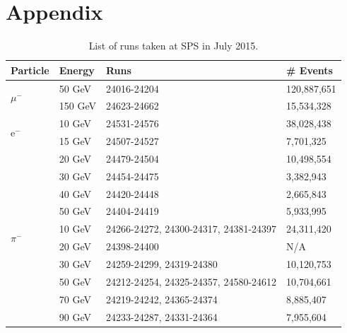 \documentclass{JINST}
\begin{document}



% 

\clearpage

\appendix
\section{Appendix}
\label{appendix:Additional}

\begin{table}[htb!]
  \centering
  \caption{List of runs taken at SPS in July 2015.}
  \label{table:dataruns}
  \begin{tabular}{@{}lp{2cm}p{7.5cm}p{2cm}@{}}
    \toprule
    \multicolumn{1}{l}{\textbf{Particle}} & \textbf{Energy} & \textbf{Runs} & \textbf{\# Events}\\
    \midrule
    \multirow{2}{*}{$\mu^-$}& 50 GeV & 24016-24204 & 120,887,651\\& 150 GeV & 24623-24662 & 15,534,328\\
    \midrule
    \multirow{2}{*}{e$^-$}& 10 GeV & 24531-24576 & 38,028,438\\& 15 GeV & 24507-24527 & 7,701,325\\& 20 GeV & 24479-24504 & 10,498,554\\& 30 GeV & 24454-24475 & 3,382,943\\& 40 GeV & 24420-24448 & 2,665,843\\& 50 GeV & 24404-24419 & 5,933,995\\
    \midrule
    \multirow{2}{*}{$\pi^-$}& 10 GeV & 24266-24272, 24300-24317, 24381-24397 & 24,311,420\\& 20 GeV & 24398-24400 & N/A\\& 30 GeV & 24259-24299, 24319-24380 & 10,120,753\\& 50 GeV & 24212-24254, 24325-24357, 24580-24612 & 10,704,661\\& 70 GeV & 24219-24242, 24365-24374 & 8,885,407\\& 90 GeV & 24233-24287, 24331-24364 & 7,955,604\\
    \bottomrule
  \end{tabular}
\end{table}
\end{document}
